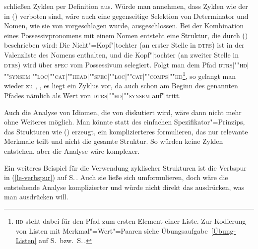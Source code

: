 \citet[]{ps} schließen Zyklen per Definition aus. Würde man annehmen, dass
Zyklen wie der in () verboten sind, wäre auch eine gegenseitige Selektion von Determinator und Nomen, wie sie von
\citet[Abschnitt~1.8]{ps2} vorgeschlagen wurde, %
ausgeschlossen. Bei der Kombination eines Possessivpronomens mit einem Nomen entsteht eine Struktur, die durch ()
beschrieben wird:
\ea
{}
\z
Die Nicht"=Kopf"|tochter (an erster Stelle in \textsc{dtrs}) ist in der Valenzliste des Nomens
enthalten, und die Kopf"|tochter (an zweiter Stelle in \textsc{dtrs}) wird
über \textsc{spec} vom Possessivum selegiert. Folgt man dem Pfad
\textsc{dtrs$|$""hd$|$""synsem$|$""loc$|$""cat$|$""head$|$""spec$|$""loc$|$""cat$|$""comps$|$""hd}\footnote{
  \textsc{hd} steht dabei für den Pfad zum ersten Element einer Liste. Zur Kodierung von Listen mit
  Merkmal"=Wert"=Paaren siehe Übungsaufgabe~\ref{Übung-Listen} auf S.\,\pageref{Übung-Listen} bzw.\ S.\,\pageref{Seite-Lösungen-Listen}.%
}, so gelangt man wieder zu , \dash, es liegt ein Zyklus vor, da  auch schon am
Beginn des genannten Pfades nämlich als Wert von \textsc{dtrs$|$""hd$|$""synsem} auf"|tritt.

Auch die Analyse von Idiomen, die von \citet{SS2003a}
diskutiert wird, wäre dann nicht mehr ohne Weiteres möglich. Man könnte statt des einfachen
Spezifikator"=Prinzips, das Strukturen wie () erzeugt, ein komplizierteres formulieren, das
nur relevante Merkmale teilt und nicht die gesamte Struktur.
So würden keine Zyklen entstehen, aber
die Analyse wäre komplexer. 

Ein weiteres Beispiel für die Verwendung zyklischer Strukturen ist die Verbspur in
(\ref{le-verbspur}) auf S.\,\pageref{le-verbspur}. Auch sie ließe sich umformulieren, doch wäre
die entstehende Analyse komplizierter und würde nicht direkt das ausdrücken, was man ausdrücken will.%

